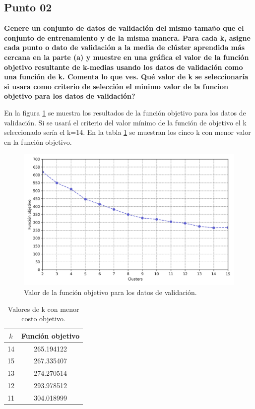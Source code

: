 \subsection*{Punto 02}

\textbf{Genere un conjunto de datos de validación del mismo tamaño que el conjunto de entrenamiento y de la misma manera. Para cada k, asigne cada punto o dato de validación a la media de clúster aprendida más cercana en la parte (a) y muestre en una gráfica el valor de la función objetivo resultante de k-medias usando los datos de validación como una función de k. Comenta lo que ves. Qué valor de k se seleccionaría si usara como criterio de selección el minimo valor de la funcion objetivo para los datos de validación?}

En la figura \ref{fig:problema_03_validation_scores} se muestra los resultados de la función objetivo para los datos de validación. Si se usará el criterio del valor mínimo de la función de objetivo el k seleccionado sería el k=14. En la tabla \ref{table:problema_3_minimum_cost} se muestran los cinco k con menor valor en la función objetivo.

\begin{figure}[H]
    \centering
    \includegraphics[width=14cm]{Graphics/Problema_03/validation_scores.png}
    \caption{Valor de la función objetivo para los datos de validación.}
    \label{fig:problema_03_validation_scores}
\end{figure}

\begin{table}[H]
    \centering
    \begin{tabular}{cc} \hline
        $k$ & \textbf{Función objetivo} \\ \hline
        14  & 265.194122                \\
        15  & 267.335407                \\
        13  & 274.270514                \\
        12  & 293.978512                \\
        11  & 304.018999                \\ \hline
    \end{tabular}
    \caption{Valores de k con menor costo objetivo.}
    \label{table:problema_3_minimum_cost}
\end{table}